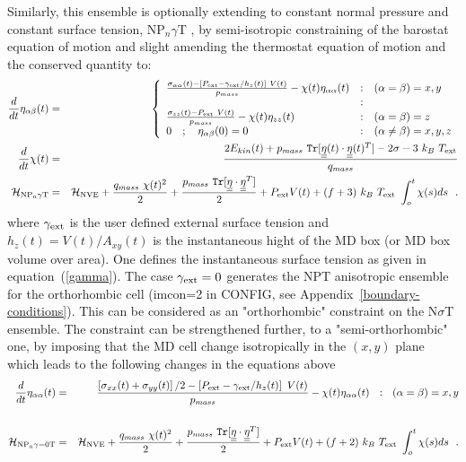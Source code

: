 Similarly, this ensemble is optionally extending to constant
normal pressure and constant surface tension, NP$_{n}\gamma$T
\cite{ikeguchi-04a}, by semi-isotropic constraining of the
barostat equation of motion and slight amending the thermostat
equation of motion and the conserved quantity to:
\begin{eqnarray}
\frac{d}{dt} \eta_{\alpha\beta}(t) &=& \left\{ \begin{array} {l@{\quad:\quad}l}
\frac{\sigma_{\alpha\alpha}(t) - \left[ P_{\rm ext} - \gamma_{\rm ext} / h_{z}(t) \right]~V(t)}{p_{mass}} -
\chi(t) \eta_{\alpha\alpha}(t) & (\alpha = \beta) = x,y \\
& \\
\frac{\sigma_{zz}(t) - P_{\rm ext}~V(t)}{p_{mass}} -
\chi(t) \eta_{zz}(t) & (\alpha = \beta) = z \\
0~~~;~~~\eta_{\alpha\beta}(0) = 0 & (\alpha \ne \beta) = x,y,z
\end{array} \right. \nonumber \\
\frac{d}{dt} \chi(t) &=& \frac{2 E_{kin}(t) + p_{mass}~{\tt Tr}[\mat{\eta}(t) \cdot
\mat{\eta}(t)^{T}] - 2 \sigma - 3~k_{B}~T_{\rm ext}}{q_{mass}} \\
{\cal H}_{\rm NP_{n}\gamma T} &=& {\cal H}_{\rm NVE} + {q_{mass}~\chi (t)^{2} \over 2} +
{p_{mass}~{\tt Tr}[\mat{\eta} \cdot \mat{\eta}^{T}] \over 2} + P_{\rm ext} V(t) +
(f+3)~k_{B}~T_{\rm ext}~\int_o^t \chi (s) ds~~. \nonumber
\end{eqnarray}
where $\gamma_{\rm ext}$ is the user defined external surface tension
and $h_{z}(t) = V(t) / A_{xy}(t)$ is the instantaneous hight of the
MD box (or MD box volume over area).  One defines the instantaneous surface
tension as given in equation~(\ref{gamma}).  The case $\gamma_{\rm ext}=0$
generates the NPT anisotropic ensemble for the orthorhombic cell
(imcon=2 in CONFIG, see Appendix~\ref{boundary-conditions}).  This
can be considered as an "orthorhombic" constraint on the N$\sigma$T ensemble.
The constraint can be strengthened further, to a "semi-orthorhombic" one, by
imposing that the MD cell change isotropically in the $(x,y)$ plane which
leads to the following changes in the equations above
\begin{eqnarray}
\frac{d}{dt} \eta_{\alpha\alpha}(t) &=& \frac{\left[\sigma_{xx}(t)+\sigma_{yy}(t)\right]/2 -
\left[ P_{\rm ext} - \gamma_{\rm ext} / h_{z}(t) \right]~V(t)}{p_{mass}} -
\chi (t) \eta_{\alpha\alpha}(t)~~:~~(\alpha = \beta) = x,y \nonumber \\
 & & \\
{\cal H}_{\rm NP_{n}{\gamma}{=0}T} &=& {\cal H}_{\rm NVE} + {q_{mass}~\chi (t)^{2} \over 2} +
{p_{mass}~{\tt Tr}[\mbox{$\underline{\underline{\bf \eta}}$} \cdot \mbox{$\underline{\underline{\bf \eta}}$}^{T}] \over 2} + P_{\rm ext} V(t) +
(f+2)~k_{B}~T_{\rm ext}~\int_o^t \chi (s) ds~~.\nonumber
\end{eqnarray}

